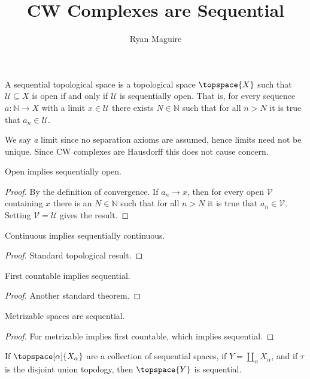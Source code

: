 \documentclass{article}                                                        %
\begin{document}
    \title{CW Complexes are Sequential}
    \author{Ryan Maguire}
    \date{\vspace{-5ex}}
    \maketitle
    \begin{definition}
        A sequential topological space is a topological space $\topspace{X}$
        such that $\mathcal{U}\subseteq{X}$ is open if and only if $\mathcal{U}$
        is sequentially open. That is, for every sequence
        $a:\mathbb{N}\rightarrow{X}$ with a limit $x\in\mathcal{U}$ there exists
        $N\in\mathbb{N}$ such that for all $n>N$ it is true that
        $a_{n}\in\mathcal{U}$.
    \end{definition}
    We say \textit{a} limit since no separation axioms are assumed, hence limits
    need not be unique. Since CW complexes are Hausdorff this does not cause
    concern.
    \begin{theorem}
        Open implies sequentially open.
    \end{theorem}
    \begin{proof}
        By the definition of convergence. If $a_{n}\rightarrow{x}$, then for
        every open $\mathcal{V}$ containing $x$ there is an $N\in\mathbb{N}$
        such that for all $n>N$ it is true that $a_{n}\in\mathcal{V}$. Setting
        $\mathcal{V}=\mathcal{U}$ gives the result.
    \end{proof}
    \begin{theorem}
        Continuous implies sequentially continuous.
    \end{theorem}
    \begin{proof}
        Standard topological result.
    \end{proof}
    \begin{theorem}
        First countable implies sequential.
    \end{theorem}
    \begin{proof}
        Another standard theorem.
    \end{proof}
    \begin{theorem}
        Metrizable spaces are sequential.
    \end{theorem}
    \begin{proof}
        For metrizable implies first countable, which implies sequential.
    \end{proof}
    \begin{theorem}
        If $\topspace[\alpha]{X_{\alpha}}$ are a collection of sequential
        spaces, if $Y=\coprod_{\alpha}X_{\alpha}$, and if $\tau$ is the
        disjoint union topology, then $\topspace{Y}$ is sequential.
    \end{theorem}
\end{document}
